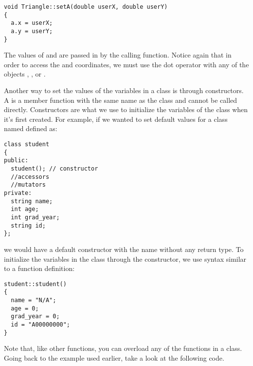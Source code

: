 \noindent\begin{minipage}{\linewidth}\begin{lstlisting}
void Triangle::setA(double userX, double userY)
{
  a.x = userX;
  a.y = userY;
}
\end{lstlisting}\end{minipage}

The values of  and  are passed in by the calling function. 
Notice again that in order to access the  and  coordinates, we must use the dot operator with any of the  objects , , or .



Another way to set the values of the variables in a class is through constructors. 
A  is a member function with the same name as the class and cannot be called directly. 
Constructors are what we use to initialize the variables of the class when it's first created. 
For example, if we wanted to set default values for a class named  defined as: \nopagebreak[4]

\noindent\begin{minipage}{\linewidth}\begin{lstlisting}
class student
{
public:
  student(); // constructor
  //accessors
  //mutators
private:
  string name;
  int age;
  int grad_year;
  string id;
};
\end{lstlisting}\end{minipage}

\noindent we would have a default constructor with the name  without any return type. 
To initialize the variables in the class through the constructor, we use syntax similar to a function definition:

\noindent\begin{minipage}{\linewidth}\begin{lstlisting}
student::student()
{
  name = "N/A";
  age = 0;
  grad_year = 0;
  id = "A00000000";
}
\end{lstlisting}\end{minipage}


Note that, like other functions, you can overload any of the functions in a class. 
Going back to the  example used earlier, take a look at the following code. 


